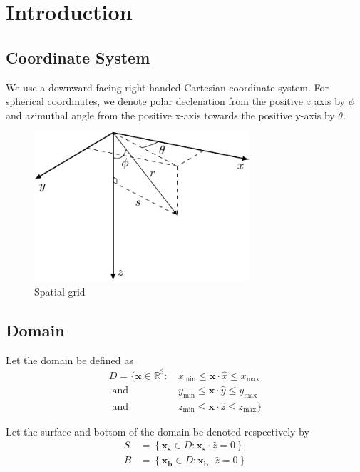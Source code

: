 \documentclass[10pt]{article}
\newcommand\RR{\mathbb{R}}
\newcommand\xmin{x_{\mbox{min}}}
\newcommand\xmax{x_{\mbox{max}}}
\newcommand\ymin{y_{\mbox{min}}}
\newcommand\ymax{y_{\mbox{max}}}
\newcommand\zmin{z_{\mbox{min}}}
\newcommand\zmax{z_{\mbox{max}}}
\renewcommand\vec{\mathbf}
\begin{document}
\section{Introduction}
\subsection{Coordinate System}
We use a downward-facing right-handed Cartesian coordinate system.
For spherical coordinates, we denote polar declenation from the positive $z$
axis by $\phi$ and azimuthal angle from the positive x-axis towards the positive
y-axis by $\theta$.
\begin{figure}[H]
  \centering
  \includegraphics[width=8cm]{3d_coords.pdf}
  \caption{Spatial grid}
\end{figure}

\subsection{Domain}

Let the domain be defined as
\begin{equation}
  \begin{split}
    D = \big\{
    \vec{x} \in \RR^3 :\, &\xmin \leq \vec{x} \cdot \hat{x} \leq \xmax \\
    \mbox{ and } &\ymin \leq \vec{x} \cdot \hat{y} \leq \ymax \\
    \mbox{ and } &\zmin \leq \vec{x} \cdot \hat{z} \leq \zmax
    \big\}
  \end{split}
\end{equation}

Let the surface and bottom of the domain be denoted respectively by
\begin{align}
  S &= \left\{\vec{x_s} \in D: \vec{x_s} \cdot \hat{z} = 0 \right\} \\
  B &= \left\{\vec{x_b} \in D: \vec{x_b} \cdot \hat{z} = 0 \right\}
\end{align}
\end{document}
